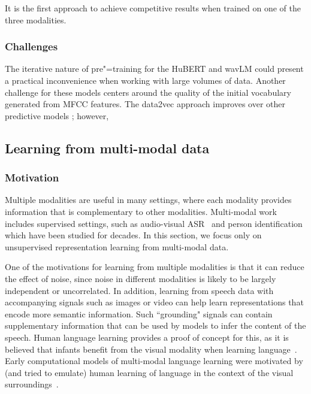  It is the first approach to achieve competitive results when trained on  one of the three modalities. 

\subsubsection{Challenges}
The iterative nature of pre"=training for the HuBERT and wavLM could present a practical inconvenience when working with large volumes of data. Another challenge for these models centers around the quality of the initial vocabulary generated from MFCC features. 
The data2vec approach improves over other predictive models ; however, 

\subsection{Learning from multi-modal data}
\subsubsection{Motivation}
Multiple modalities are useful in many settings, where each modality provides information that is complementary to other modalities.  Multi-modal work includes supervised settings, such as audio-visual ASR~\parencite{petajan_automatic_1984,potamianos_recent_2003} and person identification~\parencite{aleksic_audiovisual_2006} which have been studied for decades.  In this section, we focus only on unsupervised representation learning from multi-modal data.

One of the motivations for learning from multiple modalities is that it can reduce the effect of noise, since noise in different modalities is likely to be largely independent or uncorrelated.  In addition, learning from speech data with accompanying signals such as images or video can help learn representations that encode more semantic information. Such ``grounding" signals can contain supplementary information that can be used by models to infer the content of the speech. Human language learning provides a proof of concept for this, as it is believed that infants benefit from the visual modality when learning language~\parencite{legerstee_infants_1990}. Early computational models of multi-modal language learning were motivated by (and tried to emulate) human learning of language in the context of the visual surroundings~\parencite{roy_learning_1999}.

